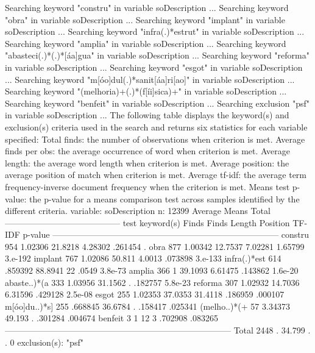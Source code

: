 Searching keyword "constru" in variable soDescription ...
Searching keyword "obra" in variable soDescription ...
Searching keyword "implant" in variable soDescription ...
Searching keyword "infra(.)*estrut" in variable soDescription ...
Searching keyword "amplia" in variable soDescription ...
Searching keyword "abasteci(.)*(.)*[áa]gua" in variable soDescription ...
Searching keyword "reforma" in variable soDescription ...
Searching keyword "esgot" in variable soDescription ...
Searching keyword "m[óo]dul(.)*sanit[áa]ri[ao]" in variable soDescription ...
Searching keyword "(melhoria)+(.)*(f[íi]sica)+" in variable soDescription ...
Searching keyword "benfeit" in variable soDescription ...
Searching exclusion "psf" in variable soDescription ...
{\smallskip}
{\smallskip}
The following table displays the keyword(s) and exclusion(s) criteria used in
the search and returns six statistics for each variable specified:
{\smallskip}
Total finds:           the number of observations when criterion is met.
Average finds per obs: the average occurrence of word when criterion is met.
Average length:        the average word length when criterion is met.
Average position:      the average position of match when criterion is met.
Average tf-idf:        the average term frequency-inverse document frequency
                       when the criterion is met.
Means test p-value:    the p-value for a means comparison test across samples
                       identified by the different criteria.
{\smallskip}
                               {}                               
variable:   soDescription
n: 12399                                     Average                       Means
                    Total   -----------------------------------------       test
keyword(s)          Finds      Finds     Length   Position     TF-IDF    p-value
--------------------------------------------------------------------------------
constru               954    1.02306    21.8218    4.28302    .261454          .
obra                  877    1.00342    12.7537    7.02281    1.65799    3.e-192
implant               767    1.02086     50.811     4.0013    .073898    3.e-133
infra(.)*es{\tytilde}t         614    .859392    88.8941         22      .0549    3.8e-73
amplia                366          1    39.1093    6.61475    .143862    1.6e-20
abaste..)*({\tytilde}a         333    1.03956    31.1562          .    .182757    5.8e-23
reforma               307    1.02932    14.7036    6.31596    .429128    2.5e-08
esgot                 255    1.02353    37.0353    31.4118    .186959    .000107
m[óo]du..)*s{\tytilde}]        255    .668845    36.6784          .    .158417    .025341
(melho..)*({\tytilde}+          57    3.34373     49.193          .    .301284    .004674
benfeit                 3          1         12          3    .702908    .083265
--------------------------------------------------------------------------------
Total                2448          .     34.799          .          .          0
exclusion(s):
"psf"
